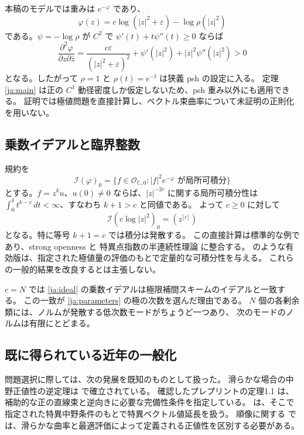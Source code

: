 \documentclass[12pt]{amsart}
\theoremstyle{definition}
\theoremstyle{remark}
\numberwithin{equation}{section}
\newcommand{\cI}{\mathcal{I}}
\newcommand{\cO}{\mathcal{O}}
\newcommand{\C}{\mathbb{C}}
\theoremstyle{definition}
\begin{document}
本稿のモデルでは重みは $e^{-\varphi}$ であり、
\begin{equation}\label{ja:psh}
 \varphi(z)=c\log(|z|^2+\varepsilon)-\log\rho(|z|^2)
\end{equation}
である。$\psi=-\log\rho$ が $C^2$ で
$\psi'(t)+t\psi''(t)\ge0$ ならば
\begin{equation}\label{ja:hessian}
 \frac{\partial^2\varphi}{\partial z\partial\bar z}
 =\frac{c\varepsilon}{(|z|^2+\varepsilon)^2}
  +\psi'(|z|^2)+|z|^2\psi''(|z|^2)>0
\end{equation}
となる。したがって $\rho=1$ と $\rho(t)=e^{-t}$ は狭義 psh の設定に入る。
定理\ref{ja:main} は正の $C^1$ 動径密度しか仮定しないため、psh 重み以外にも適用できる。
証明では極値問題を直接計算し、ベクトル束曲率について未証明の正則化を用いない。

\subsection{乗数イデアルと臨界整数}
規約を
\[
 \cI(\varphi)_0
 =\{f\in\cO_{\C,0}: |f|^2e^{-\varphi}\text{ が局所可積分}\}
\]
とする。$f=z^ku$、$u(0)\ne0$ ならば、$|z|^{-2c}$ に関する局所可積分性は
$\int_0^\delta t^{k-c}\,dt<\infty$、すなわち $k+1>c$ と同値である。
よって $c\ge0$ に対して
\begin{equation}\label{ja:ideal}
 \cI(c\log|z|^2)_0=(z^{\lfloor c\rfloor})
\end{equation}
となる。特に等号 $k+1=c$ では積分は発散する。
この直接計算は標準的な例であり、strong openness \cite{GZSO} と
特異点指数の半連続性理論 \cite{DK01} に整合する。
\cite{GY22} のような有効版は、指定された極値量の評価のもとで定量的な可積分性を与える。
これらの一般的結果を改良するとは主張しない。

$c=N$ では \eqref{ja:ideal} の乗数イデアルは極限補間スキームのイデアルと一致する。
この一致が \eqref{ja:parameters} の極の次数を選んだ理由である。
$N$ 個の各剰余類には、ノルムが発散する低次数モードがちょうど一つあり、
次のモードのノルムは有限にとどまる。

\subsection{既に得られている近年の一般化}
問題選択に際しては、次の発展を既知のものとして扱った。
滑らかな場合の中野正値性の逆定理は \cite{DNWZ23} で確立されている。
確認したプレプリントの定理1.1 は、補助的な正の直線束と逆向きに必要な完備性条件を指定している。
\cite{GMY26} は、そこで指定された特異中野条件のもとで特異ベクトル値延長を扱う。
順像に関する \cite{Ber09,IMW24} では、滑らかな曲率と最適評価によって定義される正値性を区別する必要がある。
\end{document}
